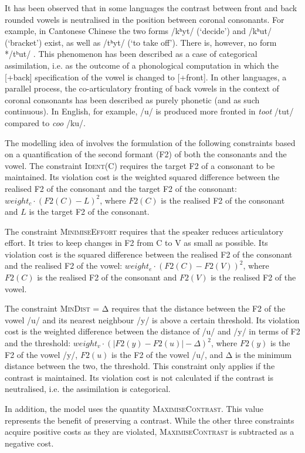It has been observed that in some languages the contrast between front and back rounded vowels is neutralised in the position between coronal consonants. For example, in Cantonese Chinese the two  forms /kʰyt/ (`decide') and /kʰut/ (`bracket') exist, as well as /tʰyt/ (`to take off'). There is, however, no form */tʰut/ \citep{Flemming2001}. This phenomenon has been described as a case of categorical assimilation, i.e. as the outcome of a phonological computation in which the  [+back] specification of the vowel is changed to [+front]. In other languages, a parallel process, the co-articulatory fronting of back vowels in the context of coronal consonants has been described as purely phonetic (and as such continuous). In English, for example, /u/ is produced more fronted in \emph{toot} /tut/ compared to \emph{coo} /ku/.

The modelling idea of \citet{Flemming2001} involves the formulation of the following constraints based on a quantification of the second formant (F2) of both the consonants and the vowel. The constraint \textsc{Ident(C)} requires the target F2 of a consonant to be maintained. Its violation cost is the weighted squared difference between the realised F2 of the consonant and the target F2 of the consonant: $weight_c \cdot (F2(C) - L)^2$, where $F2(C)$ is the realised F2 of the consonant and $L$ is the target F2 of the consonant.

The constraint \textsc{MinimiseEffort} requires that the speaker reduces articulatory effort. It tries to keep changes in F2 from C to V as small as possible. Its violation cost is the squared difference between the realised F2 of the consonant and the realised F2 of the vowel: $weight_e \cdot (F2(C) - F2(V))^2$, where $F2(C)$ is the realised F2 of the consonant and $F2(V)$ is the realised F2 of the vowel.

The constraint \textsc{MinDist  = Δ} requires that the distance between the F2 of the vowel /u/ and its nearest neighbour /y/ is above a certain threshold. Its violation cost is the weighted difference between the distance of /u/ and /y/ in terms of F2 and the threshold: $weight_v \cdot (|F2(y) - F2(u)| - \Delta)^2$, where $F2(y)$ is the F2 of the vowel /y/, $F2(u)$ is the F2 of the vowel /u/, and Δ is the minimum distance between the two, the threshold. This constraint only applies if the contrast is maintained. Its violation cost is not calculated if the contrast is neutralised, i.e. the assimilation is categorical.

In addition, the model uses the quantity \textsc{MaximiseContrast}. This value represents the benefit of preserving a contrast. While the other three constraints acquire positive costs as they are violated, \textsc{MaximiseContrast} is subtracted as a negative cost.

